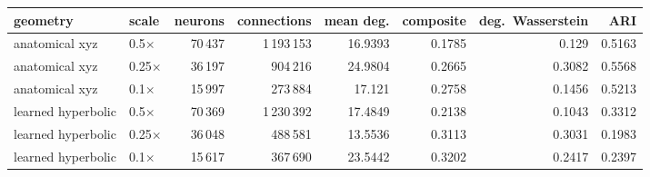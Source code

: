 {\small\setlength{\tabcolsep}{3pt}
\begin{tabular}{l l r r r r r r}
\toprule
geometry & scale & neurons & connections & mean deg. & composite & deg.\ Wasserstein & ARI \\
\midrule
anatomical xyz & 0.5$\times$ & 70\,437 & 1\,193\,153 & 16.9393 & 0.1785 & 0.129 & 0.5163 \\
anatomical xyz & 0.25$\times$ & 36\,197 & 904\,216 & 24.9804 & 0.2665 & 0.3082 & 0.5568 \\
anatomical xyz & 0.1$\times$ & 15\,997 & 273\,884 & 17.121 & 0.2758 & 0.1456 & 0.5213 \\
learned hyperbolic & 0.5$\times$ & 70\,369 & 1\,230\,392 & 17.4849 & 0.2138 & 0.1043 & 0.3312 \\
learned hyperbolic & 0.25$\times$ & 36\,048 & 488\,581 & 13.5536 & 0.3113 & 0.3031 & 0.1983 \\
learned hyperbolic & 0.1$\times$ & 15\,617 & 367\,690 & 23.5442 & 0.3202 & 0.2417 & 0.2397 \\
\bottomrule
\end{tabular}

}

